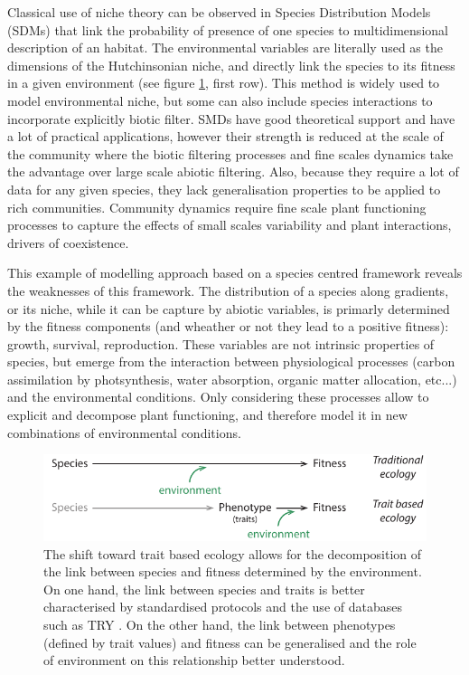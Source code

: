 Classical use of niche theory can be observed in Species Distribution Models (SDMs) that link the probability of presence of one species to multidimensional description of an habitat. The environmental variables are literally used as the dimensions of the Hutchinsonian niche, and directly link the species to its fitness in a given environment (see figure \ref{fig:paradigm_shift}, first row). This method is widely used to model environmental niche, but some can also include species interactions to incorporate explicitly biotic filter. SMDs have good theoretical support and have a lot of practical applications, however their strength is reduced at the scale of the community where the biotic filtering processes and fine scales dynamics take the advantage over large scale abiotic filtering. Also, because they require a lot of data for any given species, they lack generalisation properties to be applied to rich communities. Community dynamics require fine scale plant functioning processes to capture the effects of small scales variability and plant interactions, drivers of coexistence. 

This example of modelling approach based on a species centred framework reveals the weaknesses of this framework. The distribution of a species along gradients, or its niche, while it can be capture by abiotic variables, is primarly determined by the fitness components (and wheather or not they lead to a positive fitness): growth, survival, reproduction. These variables are not intrinsic properties of species, but emerge from the interaction between physiological processes (carbon assimilation by photsynthesis, water absorption, organic matter allocation, etc...) and the environmental conditions. Only considering these processes allow to explicit and decompose plant functioning, and therefore model it in new combinations of environmental conditions.

\begin{figure}
    \includegraphics[width=1\linewidth]{./2_PP/Figures/Concepts/species_to_fitness.pdf}
  \caption[From discrete to continuous link between species and fitness]{The shift toward trait based ecology allows for the decomposition of the link between species and fitness determined by the environment. On one hand, the link between species and traits is better characterised by standardised protocols and the use of databases such as TRY \parencite{TRY}. On the other hand, the link between phenotypes (defined by trait values) and fitness can be generalised and the role of environment on this relationship better understood.}
  \label{fig:paradigm_shift}
\end{figure}

